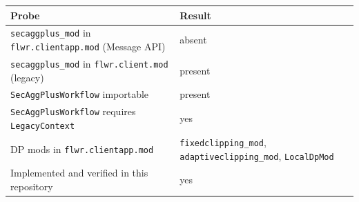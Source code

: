 \begin{tabular}{lp{5.2cm}}
    \toprule
    Probe & Result \\
    \midrule
    \texttt{secaggplus\_mod} in \texttt{flwr.clientapp.mod} (Message API) & absent \\
    \texttt{secaggplus\_mod} in \texttt{flwr.client.mod} (legacy) & present \\
    \texttt{SecAggPlusWorkflow} importable & present \\
    \texttt{SecAggPlusWorkflow} requires \texttt{LegacyContext} & yes \\
    DP mods in \texttt{flwr.clientapp.mod} & \texttt{fixedclipping\_mod}, \texttt{adaptiveclipping\_mod}, \texttt{LocalDpMod} \\
    Implemented and verified in this repository & yes \\
    \bottomrule
\end{tabular}
